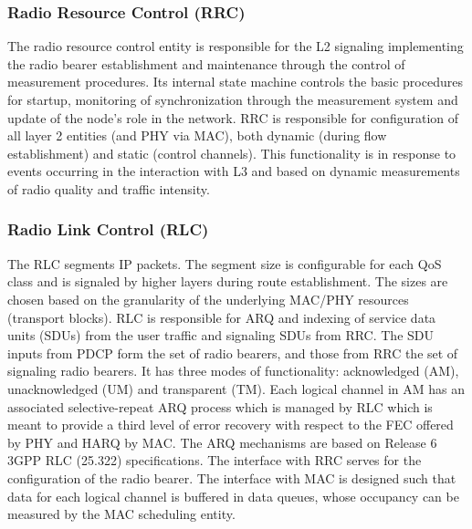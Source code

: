 \documentclass[a4paper,twocolumn,journal]{IEEEtran}
\begin{document}
\subsubsection{Radio Resource Control (RRC)}
The radio resource control entity is responsible for the L2 signaling implementing the radio bearer establishment and maintenance through the control of measurement procedures. Its internal state machine controls the basic procedures for startup, monitoring of synchronization through the measurement system and update of the node's role in the network. RRC is responsible for configuration of all layer 2 entities (and PHY via MAC), both dynamic (during flow establishment) and static (control channels). This functionality is in response to events occurring in the interaction with L3 and based on dynamic measurements of radio quality and traffic intensity. 



\subsubsection{Radio Link Control (RLC)}
The RLC segments IP packets. The segment size is configurable for each QoS class and is signaled by higher layers during route establishment. The sizes are chosen based on the granularity of the underlying MAC/PHY resources (transport blocks).  RLC is responsible for ARQ and indexing of service data units (SDUs) from the user traffic and signaling SDUs from RRC. The SDU inputs from PDCP form the set of radio bearers, and those from RRC the set of signaling radio bearers. It has three modes of functionality: acknowledged (AM), unacknowledged (UM) and transparent (TM). Each logical channel in AM has an associated selective-repeat ARQ process which is managed by RLC which is meant to provide a third level of error recovery with respect to the FEC offered by PHY and HARQ by MAC. The ARQ mechanisms are based on Release 6 3GPP RLC (25.322) specifications. The interface with RRC serves for the configuration of the radio bearer. The interface with MAC is designed such that data for each logical channel is buffered in data queues, whose occupancy can be measured by the MAC scheduling entity.
\end{document}
